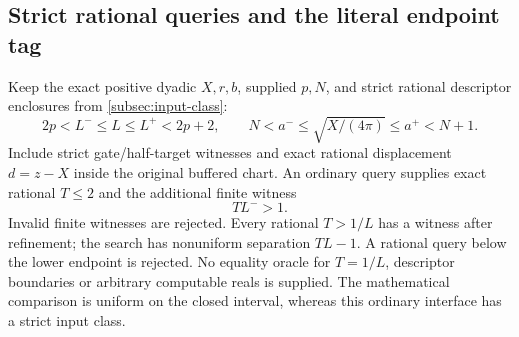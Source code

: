 \subsection{Strict rational queries and the literal endpoint tag}
\label{subsec:moving-input}
Keep the exact positive dyadic \(X,r,b\), supplied \(p,N\), and strict
rational descriptor enclosures from \cref{subsec:input-class}:
\begin{equation}
 2p<L^-\le L\le L^+<2p+2,\qquad
 N<a^-\le\sqrt{X/(4\pi)}\le a^+<N+1.
 \label{eq:moving-descriptors}
\end{equation}
Include strict gate/half-target witnesses and exact rational displacement
\(d=z-X\) inside the original buffered chart. An ordinary query supplies
exact rational \(T\le2\) and the additional finite witness
\begin{equation}
 TL^->1.
 \label{eq:moving-strict-time-witness}
\end{equation}
Invalid finite witnesses are rejected. Every rational \(T>1/L\) has a
witness after refinement; the search has nonuniform separation
\(TL-1\). A rational query below the lower endpoint is rejected.
No equality oracle for \(T=1/L\), descriptor boundaries or arbitrary
computable reals is supplied. The mathematical comparison is uniform
on the closed interval, whereas this ordinary interface has a strict
input class.

